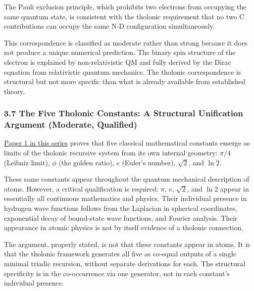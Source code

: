\documentclass[
  11pt,
  letterpaper,
]{article}
\begin{document}
The Pauli exclusion principle, which prohibits two electrons from
occupying the same quantum state, is consistent with the tholonic
requirement that no two C contributions can occupy the same N-D
configuration simultaneously.

This correspondence is classified as moderate rather than strong because
it does not produce a unique numerical prediction. The binary spin
structure of the electron is explained by non-relativistic QM and fully
derived by the Dirac equation from relativistic quantum mechanics. The
tholonic correspondence is structural but not more specific than what is
already available from established theory.

\subsubsection{3.7 The Five Tholonic Constants: A Structural Unification
Argument (Moderate,
Qualified)}\label{the-five-tholonic-constants-a-structural-unification-argument-moderate-qualified}

\href{https://github.com/baardev/truevalue/blob/main/docnav/Research/papers/1_recursive-tholonic-five-constants/1_recursive-tholonic-five-constants.pdf}{Paper
1 in this series} proves that five classical mathematical constants
emerge as limits of the tholonic recursive system from its own internal
geometry: \(\pi/4\) (Leibniz limit), \(\phi\) (the golden ratio), \(e\)
(Euler's number), \(\sqrt{2}\), and \(\ln 2\).

These same constants appear throughout the quantum mechanical
description of atoms. However, a critical qualification is required:
\(\pi\), \(e\), \(\sqrt{2}\), and \(\ln 2\) appear in essentially all
continuous mathematics and physics. Their individual presence in
hydrogen wave functions follows from the Laplacian in spherical
coordinates, exponential decay of bound-state wave functions, and
Fourier analysis. Their appearance in atomic physics is not by itself
evidence of a tholonic connection.

The argument, properly stated, is not that these constants appear in
atoms. It is that the tholonic framework generates all five as co-equal
outputs of a single minimal triadic recursion, without separate
derivations for each. The structural specificity is in the co-occurrence
via one generator, not in each constant's individual presence.
\end{document}
